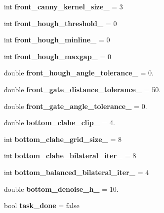 \begin{DoxyCompactItemize}
\item 
\mbox{\label{classOctagon_ae20ae84d732e1d108b9f9ebef17a15e0}} 
int {\bfseries front\+\_\+canny\+\_\+kernel\+\_\+size\+\_\+} = 3
\item 
\mbox{\label{classOctagon_a38dc6d16117d852010885329488f2c22}} 
int {\bfseries front\+\_\+hough\+\_\+threshold\+\_\+} = 0
\item 
\mbox{\label{classOctagon_afd0747af826ceb68845a97e5845c6474}} 
int {\bfseries front\+\_\+hough\+\_\+minline\+\_\+} = 0
\item 
\mbox{\label{classOctagon_a5784640d78bd54b9d3f804e6971485bb}} 
int {\bfseries front\+\_\+hough\+\_\+maxgap\+\_\+} = 0
\item 
\mbox{\label{classOctagon_af676c0a43e9a80e80e6594afbefca004}} 
double {\bfseries front\+\_\+hough\+\_\+angle\+\_\+tolerance\+\_\+} = 0.
\item 
\mbox{\label{classOctagon_a06d4848d0fa2f540bcebb40af1d96dda}} 
double {\bfseries front\+\_\+gate\+\_\+distance\+\_\+tolerance\+\_\+} = 50.
\item 
\mbox{\label{classOctagon_a8603b04b031ae06fb38e51306a05e8ba}} 
double {\bfseries front\+\_\+gate\+\_\+angle\+\_\+tolerance\+\_\+} = 0.
\item 
\mbox{\label{classOctagon_a7bfa15dbbdf5f98fecc84d32ea88ab6c}} 
double {\bfseries bottom\+\_\+clahe\+\_\+clip\+\_\+} = 4.
\item 
\mbox{\label{classOctagon_a8a4311d54b59371229c84ce0b30fb9eb}} 
int {\bfseries bottom\+\_\+clahe\+\_\+grid\+\_\+size\+\_\+} = 8
\item 
\mbox{\label{classOctagon_aa393f9dec40f6f21d4a49db75d0d30aa}} 
int {\bfseries bottom\+\_\+clahe\+\_\+bilateral\+\_\+iter\+\_\+} = 8
\item 
\mbox{\label{classOctagon_ae61cbe0134eed2dac3ef1ac66ebb919b}} 
int {\bfseries bottom\+\_\+balanced\+\_\+bilateral\+\_\+iter\+\_\+} = 4
\item 
\mbox{\label{classOctagon_a359e6996f9cf84c6938d36f96fa12ded}} 
double {\bfseries bottom\+\_\+denoise\+\_\+h\+\_\+} = 10.
\item 
\mbox{\label{classOctagon_ad9021e5849858697ae198c657ea268ae}} 
bool {\bfseries task\+\_\+done} = false
\end{DoxyCompactItemize}
